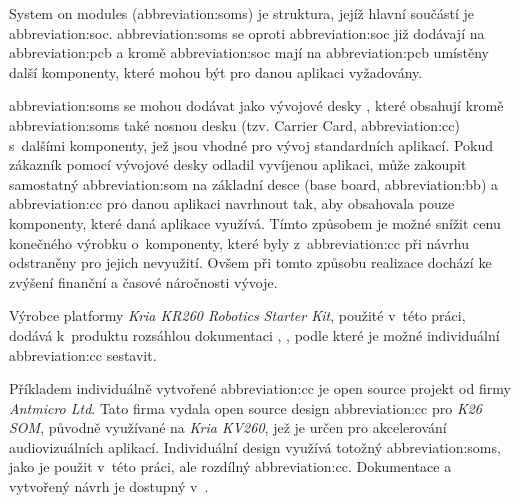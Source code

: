 \documentclass[a4paper, twoside, 11pt]{article}
\begin{document}
	System on modules (\gls{abbreviation:soms}) je struktura, jejíž hlavní součástí je \gls{abbreviation:soc}. \gls{abbreviation:soms} se oproti \gls{abbreviation:soc} již dodávají na \gls{abbreviation:pcb} a kromě \gls{abbreviation:soc} mají na \gls{abbreviation:pcb} umístěny další komponenty, které mohou být pro danou aplikaci vyžadovány. \cite{xilinx-what-is-a-som}\par
	\gls{abbreviation:soms} se mohou dodávat jako vývojové desky \cite{xilinx-kria-kr260-robotics-starter-kit}, které obsahují kromě \gls{abbreviation:soms} také nosnou desku (tzv. Carrier Card, \gls{abbreviation:cc}) s~dalšími komponenty, jež jsou vhodné pro vývoj standardních aplikací. Pokud zákazník pomocí vývojové desky odladil vyvíjenou aplikaci, může zakoupit samostatný \gls{abbreviation:som} na základní desce (base board, \gls{abbreviation:bb}) a \gls{abbreviation:cc} pro danou aplikaci navrhnout tak, aby obsahovala pouze komponenty, které daná aplikace využívá. Tímto způsobem je možné snížit cenu konečného výrobku o~komponenty, které byly z~\gls{abbreviation:cc} při návrhu odstraněny pro jejich nevyužití. Ovšem při tomto způsobu realizace dochází ke zvýšení finanční a časové náročnosti vývoje.\par
	Výrobce platformy \textit{Kria KR260 Robotics Starter Kit}, použité v~této práci, dodává k~produktu rozsáhlou dokumentaci \cite{kria-som-carrier-card-design-guide-2022}, \cite{kria-k26-som-ds}, podle které je možné individuální \gls{abbreviation:cc} sestavit. \par
	Příkladem individuálně vytvořené \gls{abbreviation:cc} je open source projekt od firmy \textit{Antmicro Ltd}. Tato firma vydala open source design \gls{abbreviation:cc} pro \textit{K26 SOM}, původně využívané na \textit{Kria KV260}, jež je určen pro akcelerování audiovizuálních aplikací. Individuální design využívá totožný \gls{abbreviation:soms}, jako je použit v~této práci, ale rozdílný \gls{abbreviation:cc}. Dokumentace a vytvořený návrh je dostupný v~\cite{antmicro-open-source-kria-k26-carrier-card}.
\end{document}
